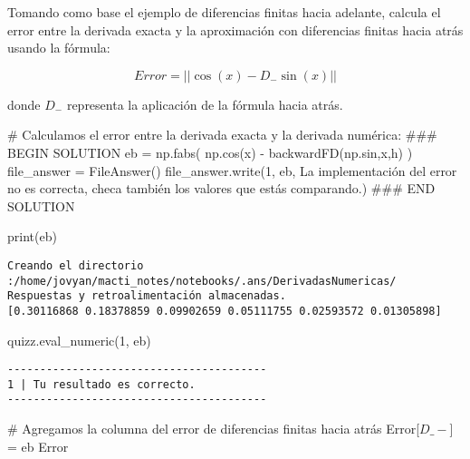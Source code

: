 \documentclass[
  letterpaper,
  DIV=11,
  numbers=noendperiod]{scrreprt}
\newenvironment{Shaded}{\begin{snugshade}}{\end{snugshade}}
\newcommand{\BuiltInTok}[1]{\textcolor[rgb]{0.00,0.23,0.31}{#1}}
\newcommand{\CommentTok}[1]{\textcolor[rgb]{0.37,0.37,0.37}{#1}}
\newcommand{\NormalTok}[1]{\textcolor[rgb]{0.00,0.23,0.31}{#1}}
\newcommand{\OperatorTok}[1]{\textcolor[rgb]{0.37,0.37,0.37}{#1}}
\newcommand{\RegionMarkerTok}[1]{\textcolor[rgb]{0.00,0.23,0.31}{#1}}
\newcommand{\StringTok}[1]{\textcolor[rgb]{0.13,0.47,0.30}{#1}}
\begin{document}
Tomando como base el ejemplo de diferencias finitas hacia adelante,
calcula el error entre la derivada exacta y la aproximación con
diferencias finitas hacia atrás usando la fórmula:

\[
Error = || \cos(x) - D_- \sin(x)||
\]

donde \(D_-\) representa la aplicación de la fórmula hacia atrás.

\begin{Shaded}
\begin{Highlighting}[]
\CommentTok{\# Calculamos el error entre la derivada exacta y la derivada numérica:}
\CommentTok{\#\#\# }\RegionMarkerTok{BEGIN}\CommentTok{ SOLUTION}
\NormalTok{eb }\OperatorTok{=}\NormalTok{ np.fabs( np.cos(x) }\OperatorTok{{-}}\NormalTok{ backwardFD(np.sin,x,h) )}
\NormalTok{file\_answer }\OperatorTok{=}\NormalTok{ FileAnswer()}
\NormalTok{file\_answer.write(}\StringTok{\textquotesingle{}1\textquotesingle{}}\NormalTok{, eb, }\StringTok{\textquotesingle{}La implementación del error no es correcta, checa también los valores que estás comparando.\textquotesingle{}}\NormalTok{)}
\CommentTok{\#\#\# }\RegionMarkerTok{END}\CommentTok{ SOLUTION}

\BuiltInTok{print}\NormalTok{(eb)}
\end{Highlighting}
\end{Shaded}

\begin{verbatim}
Creando el directorio :/home/jovyan/macti_notes/notebooks/.ans/DerivadasNumericas/
Respuestas y retroalimentación almacenadas.
[0.30116868 0.18378859 0.09902659 0.05111755 0.02593572 0.01305898]
\end{verbatim}

\begin{Shaded}
\begin{Highlighting}[]
\NormalTok{quizz.eval\_numeric(}\StringTok{\textquotesingle{}1\textquotesingle{}}\NormalTok{, eb)}
\end{Highlighting}
\end{Shaded}

\begin{verbatim}
----------------------------------------
1 | Tu resultado es correcto.
----------------------------------------
\end{verbatim}

\begin{Shaded}
\begin{Highlighting}[]
\CommentTok{\# Agregamos la columna del error de diferencias finitas hacia atrás}
\NormalTok{Error[}\StringTok{\textquotesingle{}$D\_{-}$\textquotesingle{}}\NormalTok{] }\OperatorTok{=}\NormalTok{ eb}
\NormalTok{Error}
\end{Highlighting}
\end{Shaded}
\end{document}
